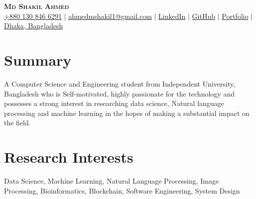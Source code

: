 \documentclass[letterpaper,11pt]{article}
\newcommand{\resumeSubHeadingListStart}{\begin{itemize}[leftmargin=0.15in, label={}]}
\newcommand{\resumeSubHeadingListEnd}{\end{itemize}}
\begin{document}


\newcommand{\iconcolor}{blue} %
\newcommand{\iconsize}{1.2em} %
\begin{center}
    \textbf{\Huge \scshape Md Shakil Ahmed} \\ \vspace{3pt}
    \small
    \faMobile \hspace{.9pt} \href{tel:8801682523401}{+880 130 846 6291}
    $|$
    \faAt \hspace{.3pt} \href{mailto:ahmedmshakil1@gmail.com}{ahmedmshakil1@gmail.com}
    $|$
    \faLinkedinSquare \hspace{.3pt} \href{https://www.linkedin.com/in/ahmedmshakil/}{LinkedIn}
    $|$
    \faGithub \hspace{.3pt} \href{https://github.com/ahmedmshakil}{GitHub}
    $|$
    \faGlobe \hspace{.3pt} \href{https://ahmedmshakil.netlify.app/}{Portfolio}
    $|$
    \faMapMarker \hspace{.5pt} \href{https://maps.app.goo.gl/yXjbz1LHBvWixLsa6}{Dhaka, Bangladesh}
\end{center}



\section{Summary}
  \vspace{4pt}
  \resumeSubHeadingListStart
 {A Computer Science and Engineering student from Independent University, Bangladesh who is Self-motivated, highly passionate  for the technology and possesses a strong interest in researching data science, Natural language processing and machine learning in the hopes of making a substantial impact on the field.}
  \resumeSubHeadingListEnd



\section{Research Interests}
  \vspace{4pt}
  \resumeSubHeadingListStart
 {Data Science, Machine Learning, Natural Language Processing, Image Processing, Bioinformatics, Blockchain, Software Engineering, System Design}
   \resumeSubHeadingListEnd
\end{document}
